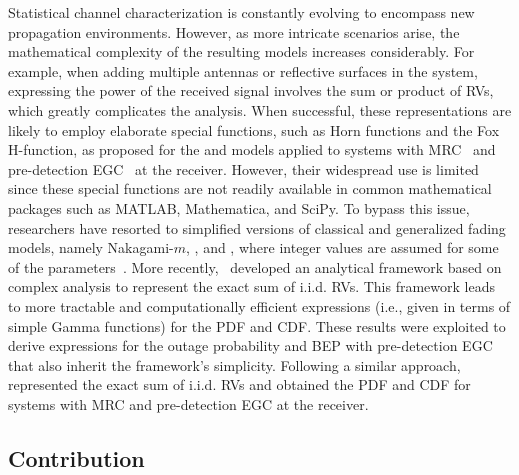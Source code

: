 \documentclass[journal,twocolumn]{IEEEtran}
\begin{document}
Statistical channel characterization is constantly evolving to encompass new propagation environments. However, as more intricate scenarios arise, the mathematical complexity of the resulting models increases considerably. For example, when adding multiple antennas or reflective surfaces in the system, expressing the power of the received signal involves the sum or product of \acp{RV}, which greatly complicates the analysis. When successful, these representations are likely to employ elaborate special functions, such as Horn functions and the Fox H-function, as proposed for the \Ehm{} and \km{} models applied to systems with \ac{MRC}~\cite{Bad21,Dix23} and pre-detection \ac{EGC}~\cite{Bad22} at the receiver. However, their widespread use is limited since these special functions are not readily available in common mathematical packages such as MATLAB, Mathematica, and SciPy. To bypass this issue, researchers have resorted to simplified versions of classical and generalized fading models, namely Nakagami-$m$, \Ehm{}, and \km{}, where integer values are assumed for some of the parameters~\cite{Lop17,Hoa20,Tej23}. More recently,~\cite{Alm23a} developed an analytical framework based on complex analysis to represent the exact sum of \ac{i.i.d.} \km{} \acp{RV}. This framework leads to more tractable and computationally efficient expressions (i.e., given in terms of simple Gamma functions) for the \ac{PDF} and \ac{CDF}. These results were exploited to derive expressions for the outage probability and \ac{BEP} with pre-detection \ac{EGC} that also inherit the framework's simplicity. Following a similar approach,~\cite{Alm23b} represented the exact sum of \ac{i.i.d.} \am{} \acp{RV} and obtained the \ac{PDF} and \ac{CDF} for systems with \ac{MRC} and pre-detection \ac{EGC} at the receiver.


\subsection{Contribution}
\end{document}

